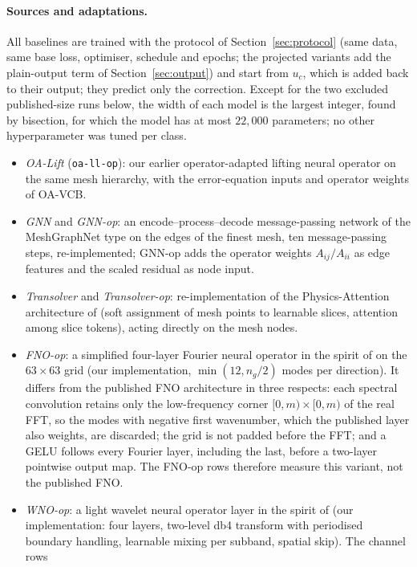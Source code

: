\paragraph{Sources and adaptations.} All baselines are trained with the protocol of Section~\ref{sec:protocol} (same data,
same base loss, optimiser, schedule and epochs; the projected variants add the plain-output term of Section~\ref{sec:output})
and start from $u_c$, which is added back to their output; they predict only the correction. Except for the two excluded
published-size runs below, the width of each model is the largest integer, found by bisection, for which the model has at most
$22{,}000$ parameters; no other hyperparameter was tuned per class.
\begin{itemize}
\item \emph{OA-Lift} (\texttt{oa-ll-op}): our earlier operator-adapted lifting neural operator on the same mesh hierarchy, with
the error-equation inputs and operator weights of OA-VCB.
\item \emph{GNN} and \emph{GNN-op}: an encode--process--decode message-passing network of the MeshGraphNet type
\cite{pfaff2021} on the edges of the finest mesh, ten message-passing steps, re-implemented; GNN-op adds the operator weights
$A_{ij}/A_{ii}$ as edge features and the scaled residual as node input.
\item \emph{Transolver} and \emph{Transolver-op}: re-implementation of the Physics-Attention architecture of \cite{wu2024transolver}
(soft assignment of mesh points to learnable slices, attention among slice tokens), acting directly on the mesh nodes.
\item \emph{FNO-op}: a simplified four-layer Fourier neural operator in the spirit of \cite{li2021fno} on the $63\times63$
grid (our implementation, $\min(12, n_g/2)$ modes per direction). It differs from the published FNO architecture in three
respects: each spectral convolution retains only the low-frequency corner $[0,m)\times[0,m)$ of the real FFT, so the modes
with negative first wavenumber, which the published layer also weights, are discarded; the grid is not padded before the FFT;
and a GELU follows every Fourier layer, including the last, before a two-layer pointwise output map. The FNO-op rows therefore
measure this variant, not the published FNO.
\item \emph{WNO-op}: a light wavelet neural operator layer in the spirit of \cite{tripura2023wno} (our implementation: four
layers, two-level db4 transform with periodised boundary handling, learnable mixing per subband, spatial skip). The channel rows

\end{itemize}
